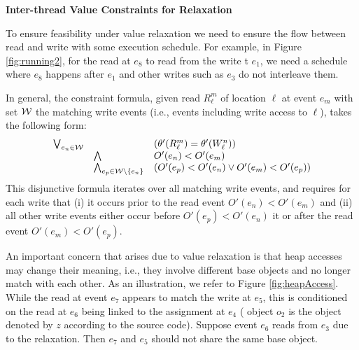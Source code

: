 {\bf Inter-thread Value Constraints for Relaxation\ } 

To ensure feasibility under value relaxation
we need to ensure the flow between read and write with some execution schedule. 
For example, in Figure \ref{fig:running2}, for the read at $e_8$ to read 
from the write t $e_1$, we need a schedule where 
$e_8$ happens after $e_1$ and other writes such as $e_3$ do not interleave them.




In general, the constraint formula, given read $R^{m}_{\ell}$ of location 
$\ell$ at event $e_m$ with set ${\cal W}$ the matching write events 
(i.e., events including write access to $\ell$), takes the following form:
$$
{\small
\begin{array}{rll}
\bigvee_{e_n \in {\cal W}} &  & (\theta'(R^{m}_{\ell}) = \theta'(W^{n}_{\ell})) \\
&		\bigwedge 	&  O'(e_n) < O'(e_m) \\
&		\bigwedge_{e_p \in {\cal W} \setminus \{ e_n \}} & (O'(e_p) < O'(e_n) \vee O'(e_m) < O'(e_p))
\end{array}
}
$$
This disjunctive formula iterates over all matching write events, and requires 
for each write that (i) it occurs prior to the 
read event $O'(e_n) < O'(e_m)$ and (ii) all other write events either 
occur before $O'(e_p) < O'(e_n)$ it or after the read 
event $O'(e_m) < O'(e_p)$.

An important concern that arises due to value relaxation 
is that heap accesses may change their meaning, i.e., they involve 
different base objects and no longer match with each other. As an 
illustration, we refer to Figure \ref{fig:heapAccess}. While the read at 
event $e_7$ appears to match the write at $e_5$, this is conditioned 
on the read at $e_6$ being linked to the assignment at $e_4$ (
object $o_2$ is the object denoted by $z$ according to the source code). 
Suppose event $e_6$ reads from $e_3$ due to the relaxation. Then $e_7$ and 
$e_5$ should not share the same base object. 



